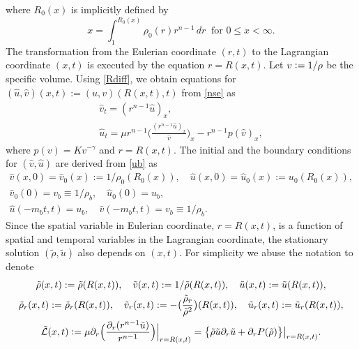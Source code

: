 \documentclass[a4paper,12pt,draft]{article}
\theoremstyle{remark}
\def\d{\partial}
\def\ut{\tilde{u}}
\def\rt{\tilde{\rho}}
\def\vt{\tilde{v}}
\def\hv{\hat{v}}
\def\hu{\hat{u}}
\def\mL{\mathcal{L}}
\newcommand{\qu}{\quad}
\begin{document}
where $R_0(x)$ is implicitly defined by 
\begin{equation*}
x = \int_{1}^{R_0(x)}\!\! \rho_0 (r) r^{n-1}\, d r \ \text{ for $0 \le x <\infty$.}
\end{equation*}
The transformation from the Eulerian coordinate $(r,t)$ to the Lagrangian coordinate $(x,t)$ is executed by the equation $r=R(x,t)$. Let $v \vcentcolon= 1/\rho$ be the specific volume. Using \eqref{Rdiff}, we obtain equations for $(\hat{u}, \hat{v})(x,t):=(u,v)(R(x,t), t)$ from \eqref{nse} as
\begin{subequations}
\label{nsl-hat}
\begin{gather}
\hv_t = (r^{n-1} \hu)_x, \label{nsl-hat1} \\
\hu_t = \mu r^{n-1} \Big( \frac{(r^{n-1} \hu)_x}{\hv} \Big)_x
- r^{n-1} p(\hv)_x, \label{nsl-hat2}
\end{gather}
\end{subequations}
where $p(v)=K v^{-\gamma}$ and $r=R(x,t)$. The initial and the boundary conditions
for $(\hv,\hu)$ are derived from \eqref{ub} as
\begin{subequations}\label{lc}
\begin{gather}
\hv(x,0) = \hv_0(x) := 1/\rho_0(R_0(x)), \qu \hu(x,0) = \hu_0(x) := u_0(R_0(x)), \label{lic-hat} \\
\hv_0(0)= v_b \equiv 1/ \rho_b, \qu \hu_0(0)=u_b, \label{lcompa-hat}\\
\hu(-m_b t,t) = u_b, \qu \hv(-m_b t,t)= v_b \equiv 1/\rho_b. \label{lbc-hat}
\end{gather}
\end{subequations}
Since the spatial variable in Eulerian coordinate, $r = R(x,t)$, is a function of spatial and temporal variables in the Lagrangian coordinate, the stationary solution $(\rt,\ut)$ also depends on $(x,t)$. For simplicity we abuse the notation to denote
\begin{gather}
    \rt(x,t):= \rt(R(x,t)), \qu \vt(x,t) := 1/\rt(R(x,t)), \qu \ut(x,t) := \ut(R(x,t)),\nonumber\\
    \rt_r(x,t) := \rt_r(R(x,t)), \qu \vt_r(x,t) := -\big(\frac{\rt_r}{\rt^2}\big)(R(x,t)), \qu \ut_r(x,t) := \ut_r(R(x,t)),\nonumber\\
    \tilde{\mL}(x,t)\vcentcolon= \mu \d_r\Big( \frac{\d_r(r^{n-1}\ut)}{r^{n-1}} \Big)\Big\vert_{r=R(x,t)} = \big\{ \rt \ut \d_r \ut + \d_r P(\rt) \big\}\big\vert_{r=R(x,t)}.\label{mL}
\end{gather}
\end{document}
